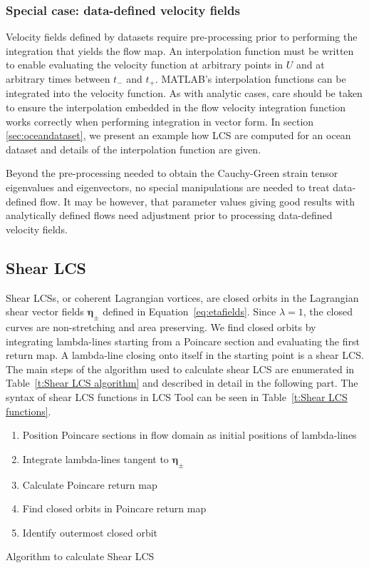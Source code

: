 \documentclass{article}
\begin{document}
\subsubsection{Special case: data-defined velocity fields}

Velocity fields defined by datasets require pre-processing prior to performing the integration that yields the flow map. An interpolation function must be written to enable evaluating the velocity function at arbitrary points in $U$ and at arbitrary times between $t_-$ and $t_+$. MATLAB's interpolation functions can be integrated into the velocity function. As with analytic cases, care should be taken to ensure the interpolation embedded in the flow velocity integration function works correctly when performing integration in vector form. In section \ref{sec:oceandataset}, we present an example how LCS are computed for an ocean dataset and details of the interpolation function are given.

Beyond the pre-processing needed to obtain the Cauchy-Green strain tensor eigenvalues and eigenvectors, no special manipulations are needed to treat data-defined flow. It may be however, that parameter values giving good results with analytically defined flows need adjustment prior to processing data-defined velocity fields.

\subsection{Shear LCS}

Shear LCSs, or coherent Lagrangian vortices, are closed orbits in the Lagrangian shear vector fields $\boldsymbol \eta_{\pm}$ defined in Equation~\eqref{eq:etafields}. Since $\lambda = 1$, the closed curves are non-stretching and area preserving. We find closed orbits by integrating lambda-lines starting from a Poincare section and evaluating the first return map. A lambda-line closing onto itself in the starting point is a shear LCS.
The main steps of the algorithm used to calculate shear LCS are enumerated in Table~\ref{t:Shear LCS algorithm} and described in detail in the following part. The syntax of shear LCS functions in LCS Tool can be seen in Table~\ref{t:Shear LCS functions}.

\begin{table}
\begin{center}
\begin{enumerate}
\item Position Poincare sections in flow domain as initial positions of lambda-lines
\item Integrate lambda-lines tangent to $\boldsymbol \eta_{\pm}$
\item Calculate Poincare return map
\item Find closed orbits in Poincare return map
\item Identify outermost closed orbit
\end{enumerate}
\end{center}
\caption{Algorithm to calculate Shear LCS}
\label{t:Shear LCS algorithm}
\end{table}
\end{document}
